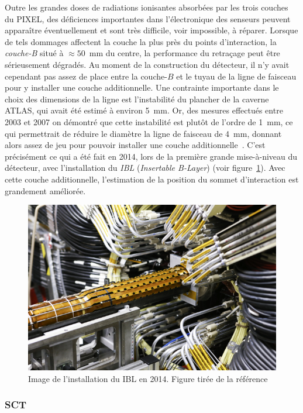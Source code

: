 Outre les grandes doses de radiations ionisantes absorbées par les
trois couches du PIXEL, des déficiences importantes dans
l'électronique des senseurs peuvent apparaître éventuellement et sont
très difficile, voir impossible, à réparer. Lorsque de tels dommages
affectent la couche la plus près du points d'interaction, la
\emph{couche-B} situé à $\approx 50$~mm du centre, la performance du
retraçage peut être sérieusement dégradés. Au moment de la
construction du détecteur, il n'y avait cependant pas assez de place
entre la couche-$B$ et le tuyau de la ligne de faisceau pour y
installer une couche additionnelle. Une contrainte importante dans le
choix des dimensions de la ligne est l'instabilité du plancher de la
caverne ATLAS, qui avait été estimé à environ 5~mm. Or, des mesures
effectués entre 2003 et 2007 on démontré que cette instabilité est
plutôt de l'ordre de 1~mm, ce qui permettrait de réduire le diam\`etre
la ligne de faisceau de 4~mm, donnant alors assez de jeu pour pouvoir
installer une couche additionnelle~\cite{capeans_atlas_2010}. C'est
précisément ce qui a été fait en 2014, lors de la première grande
mise-à-niveau du détecteur, avec l'installation du \emph{IBL}
(\emph{Insertable B-Layer}) (voir figure~\ref{fig:ibl}). Avec cette
couche additionnelle, l'estimation de la position du sommet
d'interaction est grandement améliorée.

\begin{figure}[h!]
  \centering
  \includegraphics{ibl.jpg}
  \caption{Image de l'installation du IBL en 2014. Figure tirée de la référence~\cite{MarcelloniDeOliveira:1702006}}
  \label{fig:ibl}
\end{figure}

\subsubsection{SCT}

